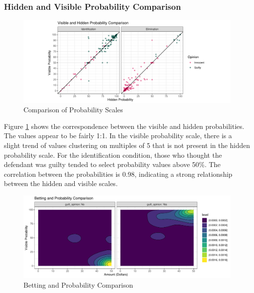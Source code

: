 \documentclass[print]{nuthesis}
\begin{document}
\hypertarget{hidden-and-visible-probability-comparison}{%
\subsubsection{Hidden and Visible Probability Comparison}\label{hidden-and-visible-probability-comparison}}

\begin{figure}

{\centering \includegraphics[width=\linewidth]{thesis_files/figure-latex/probcomp-1} 

}

\caption{Comparison of Probability Scales}\label{fig:probcomp}
\end{figure}

Figure \ref{fig:probcomp} shows the correspondence between the visible and hidden probabilities.
The values appear to be fairly 1:1.
In the visible probability scale, there is a slight trend of values clustering on multiples of 5 that is not present in the hidden probability scale.
For the identification condition, those who thought the defendant was guilty tended to select probability values above 50\%.
The correlation between the probabilities is 0.98, indicating a strong relationship between the hidden and visible scales.

\begin{figure}

{\centering \includegraphics[width=\linewidth]{thesis_files/figure-latex/probbet-1} 

}

\caption{Betting and Probability Comparison}\label{fig:probbet}
\end{figure}
\end{document}

